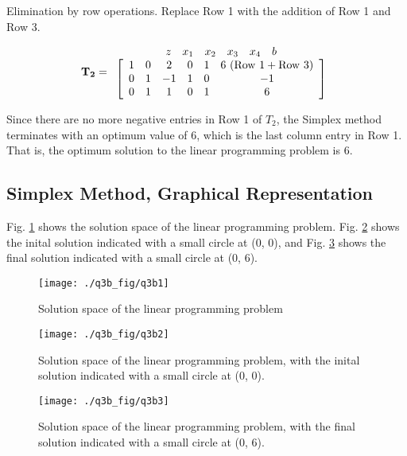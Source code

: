 \documentclass[letter,12pt]{article}
\begin{document}
Elimination by row operations. Replace Row 1 with the addition of Row 1 and Row 3.

\begin{equation*}
\mathbf{T_{2}} =  
\begin{array}{c}
	\begin{array}{cccccc}
	z & x_{1} & x_{2} & x_{3} & x_{4} & b \\
	\end{array}
	\\
	\left[ \begin{array}{cccccc}
	1 & 0 & 2 & 0 & 1 & 6\ {\rm (Row\ 1 + Row\ 3)} \\
	0 & 1 & -1 & 1 & 0 & -1  \\
	0 & 1 & 1 & 0 & 1 & 6
	\end{array} \right]
\end{array}
\end{equation*}

Since there are no more negative entries in Row 1 of $T_{2}$, the Simplex method terminates with an optimum value of 6, which is the last column entry in Row 1. \\

That is, the optimum solution to the linear programming problem is 6.

\subsection{Simplex Method, Graphical Representation}
\label{ssec:simplexmethodgraphicalrepresentation}

Fig. \ref{fig:q3b1} shows the solution space of the linear programming problem. Fig. \ref{fig:q3b2} shows the inital solution indicated with a small circle at (0, 0), and Fig. \ref{fig:q3b3} shows the final solution indicated with a small circle at (0, 6).

\begin{figure}
\centering 
\texttt{[image: ./q3b\_fig/q3b1]}
\caption{Solution space of the linear programming problem}
\label{fig:q3b1}
\end{figure}

\begin{figure}
\centering 
\texttt{[image: ./q3b\_fig/q3b2]}
\caption{Solution space of the linear programming problem, with the inital solution indicated with a small circle at (0, 0).}
\label{fig:q3b2}
\end{figure}

\begin{figure}
\centering 
\texttt{[image: ./q3b\_fig/q3b3]}
\caption{Solution space of the linear programming problem, with the final solution indicated with a small circle at (0, 6).}
\label{fig:q3b3}
\end{figure}





{\linespread{1}


}
\end{document}
